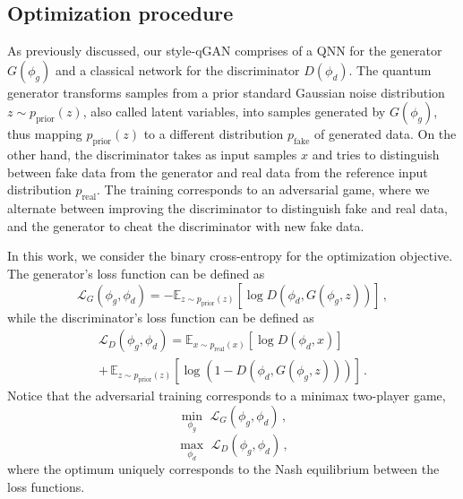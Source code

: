 \documentclass[twocolumn,preprintnumbers,superscriptaddress]{revtex4-2}
\begin{document}
\subsection{Optimization procedure}

As previously discussed, our style-qGAN comprises of a QNN for the generator $G(\phi_g)$ and a classical network for the discriminator $D(\phi_d)$. The quantum generator transforms samples from a prior standard Gaussian noise distribution $z \sim p_{\mathrm{prior}}(z)$, also called latent variables, into samples generated by $G(\phi_g)$, thus mapping $p_{\mathrm{prior}}(z)$ to a different distribution $p_{\mathrm{fake}}$ of generated data. On the other hand, the discriminator takes as input samples $x$ and tries to distinguish between fake data from the generator and real data from the reference input distribution $p_{\mathrm{real}}$. The training corresponds to an adversarial game, where we alternate between improving the discriminator to distinguish fake and real data, and the generator to cheat the discriminator with new fake data.

In this work, we consider the binary cross-entropy for the optimization objective. The generator's loss function can be defined as
\begin{equation}
   \mathcal{L}_G(\phi_g,\phi_d) = -\mathbb{E}_{z \sim p_{\mathrm{prior}}(z)}[\log D(\phi_d,G(\phi_g,z))]  \,,
\end{equation}
while the discriminator's loss function can be defined as
\begin{equation}
\begin{split}
   \mathcal{L}_D(\phi_g,\phi_d) = \mathbb{E}_{x \sim p_{\mathrm{real}}(x)}[\log D(\phi_d,x)] \\+\, \mathbb{E}_{z \sim p_{\mathrm{prior}}(z)}[\log (1-D(\phi_d,G(\phi_g,z)))]\,.
\end{split}
\end{equation}
Notice that the adversarial training corresponds to a minimax two-player game,
\begin{equation}
 \underset{\phi_g}{\min}\,\,\mathcal{L}_G(\phi_g,\phi_d)  \,,
\end{equation}
\begin{equation}
 \underset{\phi_d}{\max}\,\,\mathcal{L}_D(\phi_g,\phi_d)  \,,
\end{equation}
where the optimum uniquely corresponds to the Nash equilibrium between the loss functions.
\end{document}
